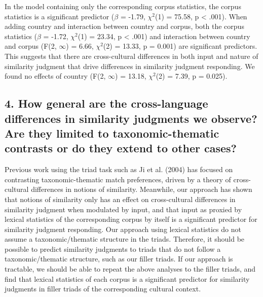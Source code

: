 \documentclass[10pt, letterpaper]{article}
\begin{document}
In the model containing only the corresponding corpus statistics, the
corpus statistics is a significant predictor (\(\beta\) = -1.79,
\(\chi^2\)(1) = 75.58, p \textless{} .001). When adding country and
interaction between country and corpus, both the corpus statistics
(\(\beta\) = -1.72, \(\chi^2\)(1) = 23.34, p \textless{} .001) and
interaction between country and corpus (F(2, \ensuremath{\infty{}}) =
6.66, \(\chi^2\)(2) = 13.33, p = 0.001) are significant predictors. This
suggests that there are cross-cultural differences in both input and
nature of similarity judgment that drive differences in similarity
judgment responding. We found no effects of country (F(2,
\ensuremath{\infty{}}) = 13.18, \(\chi^2\)(2) = 7.39, p = 0.025).

\hypertarget{how-general-are-the-cross-language-differences-in-similarity-judgments-we-observe-are-they-limited-to-taxonomic-thematic-contrasts-or-do-they-extend-to-other-cases}{%
\subsection{4. How general are the cross-language differences in
similarity judgments we observe? Are they limited to taxonomic-thematic
contrasts or do they extend to other
cases?}\label{how-general-are-the-cross-language-differences-in-similarity-judgments-we-observe-are-they-limited-to-taxonomic-thematic-contrasts-or-do-they-extend-to-other-cases}}

Previous work using the triad task such as Ji et al. (2004) has focused
on contrasting taxonomic-thematic match preferences, driven by a theory
of cross-cultural differences in notions of similarity. Meanwhile, our
approach has shown that notions of similarity only has an effect on
cross-cultural differences in similarity judgment when modulated by
input, and that input as proxied by lexical statistics of the
corresponding corpus by itself is a significant predictor for similarity
judgment responding. Our approach using lexical statistics do not assume
a taxonomic/thematic structure in the triads. Therefore, it should be
possible to predict similarity judgments to triads that do not follow a
taxonomic/thematic structure, such as our filler triads. If our approach
is tractable, we should be able to repeat the above analyses to the
filler triads, and find that lexical statistics of each corpus is a
significant predictor for similarity judgments in filler triads of the
corresponding cultural context.
\end{document}

